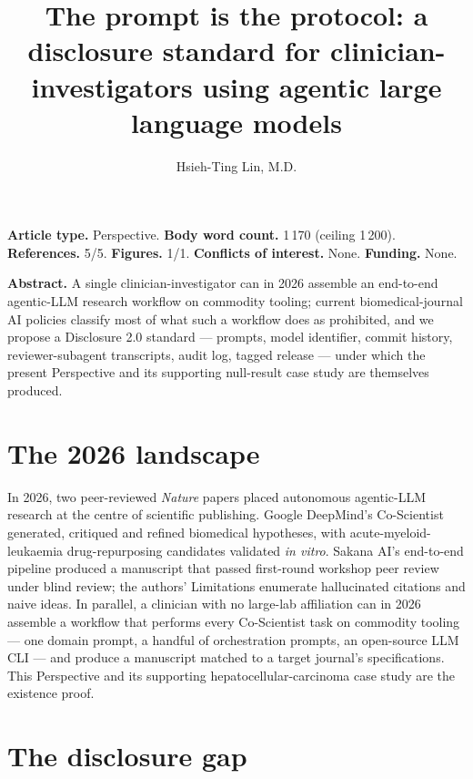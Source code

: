 \documentclass[11pt,a4paper]{article}
\title{\fontsize{15}{18}\bfseries\sffamily
The prompt is the protocol: a disclosure standard for clinician-investigators using agentic large language models}
\author[1,*]{Hsieh-Ting Lin, M.D.}
\affil[1]{Department of Hematology and Medical Oncology, Koo Foundation Sun Yat-Sen Cancer Center, Taipei, Taiwan. ORCID: 0009-0002-3974-4528.}
\affil[*]{Correspondence: \texttt{mail@hsiehting.com}.}
\date{}
\begin{document}
\maketitle\thispagestyle{empty}\vspace{-2em}

\noindent\textbf{Article type.} Perspective. \textbf{Body word count.} 1\,170 (ceiling 1\,200). \textbf{References.} 5/5. \textbf{Figures.} 1/1. \textbf{Conflicts of interest.} None. \textbf{Funding.} None.

\medskip

\noindent\textbf{Abstract.} A single clinician-investigator can in 2026 assemble an end-to-end agentic-LLM research workflow on commodity tooling; current biomedical-journal AI policies classify most of what such a workflow does as prohibited, and we propose a Disclosure 2.0 standard --- prompts, model identifier, commit history, reviewer-subagent transcripts, audit log, tagged release --- under which the present Perspective and its supporting null-result case study are themselves produced.

\section{The 2026 landscape}

In 2026, two peer-reviewed \textit{Nature} papers placed autonomous agentic-LLM research at the centre of scientific publishing. Google DeepMind's Co-Scientist\citep{coscientist2026} generated, critiqued and refined biomedical hypotheses, with acute-myeloid-leukaemia drug-repurposing candidates validated \textit{in vitro}. Sakana AI's end-to-end pipeline\citep{luSakana2026} produced a manuscript that passed first-round workshop peer review under blind review; the authors' Limitations enumerate hallucinated citations and naive ideas. In parallel, a clinician with no large-lab affiliation can in 2026 assemble a workflow that performs every Co-Scientist task on commodity tooling --- one domain prompt, a handful of orchestration prompts, an open-source LLM CLI --- and produce a manuscript matched to a target journal's specifications. This Perspective and its supporting hepatocellular-carcinoma case study are the existence proof.

\section{The disclosure gap}
\end{document}
